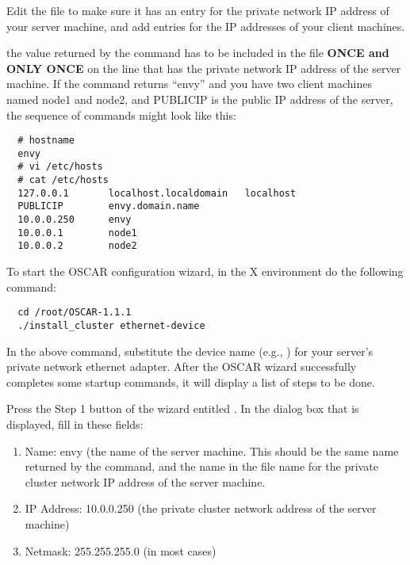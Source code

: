 
Edit the  file to make sure it has an entry for
the private network IP address of your server machine, and add entries
for the IP addresses of your client machines.

 the value returned by the 
command has to be included in the  file {\bf ONCE and
  ONLY ONCE} on the line that has the private network IP address of
the server machine.  If the  command returns ``envy''
and you have two client machines named node1 and node2, and PUBLICIP
is the public IP address of the server, the sequence of commands might
look like this:

\begin{verbatim}
  # hostname
  envy
  # vi /etc/hosts
  # cat /etc/hosts
  127.0.0.1       localhost.localdomain   localhost
  PUBLICIP        envy.domain.name
  10.0.0.250      envy
  10.0.0.1        node1
  10.0.0.2        node2
\end{verbatim}


To start the OSCAR configuration wizard, in the X environment do
the following command:

\begin{verbatim}
  cd /root/OSCAR-1.1.1
  ./install_cluster ethernet-device
\end{verbatim}
  
In the above command, substitute the device name 
(e.g., )
for your server's private network ethernet adapter. After the OSCAR 
wizard successfully completes some startup commands, it will display 
a list of steps to be done.


Press the Step 1 button of the wizard entitled . 
In the dialog box that is displayed, fill in these fields:

\begin{enumerate}
\item Name: envy (the name of the server machine. This should be the
  same name returned by the  command, and the
  name in the  file name for the private cluster network
  IP address of the server machine.
\item IP Address: 10.0.0.250 
  (the private cluster network address of the server machine)
\item Netmask: 255.255.255.0 (in most cases)
\end{enumerate}

